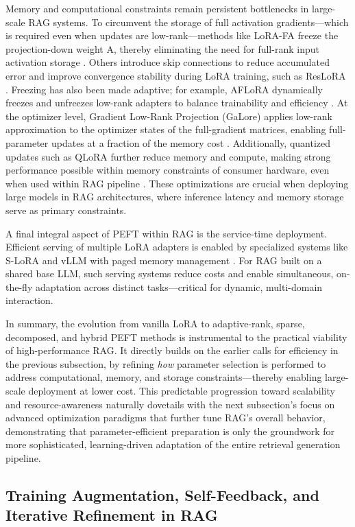 \documentclass[11pt]{article}
\begin{document}
Memory and computational constraints remain persistent bottlenecks in large-scale RAG systems. To circumvent the storage of full activation gradients---which is required even when updates are low-rank---methods like LoRA-FA freeze the projection-down weight A, thereby eliminating the need for full-rank input activation storage \cite{ref221}. Others introduce skip connections to reduce accumulated error and improve convergence stability during LoRA training, such as ResLoRA \cite{ref222}. Freezing has also been made adaptive; for example, AFLoRA dynamically freezes and unfreezes low-rank adapters to balance trainability and efficiency \cite{ref223}. At the optimizer level, Gradient Low-Rank Projection (GaLore) applies low-rank approximation to the optimizer states of the full-gradient matrices, enabling full-parameter updates at a fraction of the memory cost \cite{ref224}. Additionally, quantized updates such as QLoRA further reduce memory and compute, making strong performance possible within memory constraints of consumer hardware, even when used within RAG pipeline \cite{ref225,ref226}. These optimizations are crucial when deploying large models in RAG architectures, where inference latency and memory storage serve as primary constraints.

A final integral aspect of PEFT within RAG is the service-time deployment. Efficient serving of multiple LoRA adapters is enabled by specialized systems like S-LoRA and vLLM with paged memory management \cite{ref208}. For RAG built on a shared base LLM, such serving systems reduce costs and enable simultaneous, on-the-fly adaptation across distinct tasks---critical for dynamic, multi-domain interaction.

In summary, the evolution from vanilla LoRA to adaptive-rank, sparse, decomposed, and hybrid PEFT methods is instrumental to the practical viability of high-performance RAG. It directly builds on the earlier calls for efficiency in the previous subsection, by refining \emph{how} parameter selection is performed to address computational, memory, and storage constraints---thereby enabling large-scale deployment at lower cost. This predictable progression toward scalability and resource-awareness naturally dovetails with the next subsection's focus on advanced optimization paradigms that further tune RAG's overall behavior, demonstrating that parameter-efficient preparation is only the groundwork for more sophisticated, learning-driven adaptation of the entire retrieval generation pipeline.

\subsection{Training Augmentation, Self-Feedback, and Iterative Refinement in RAG}
\end{document}
